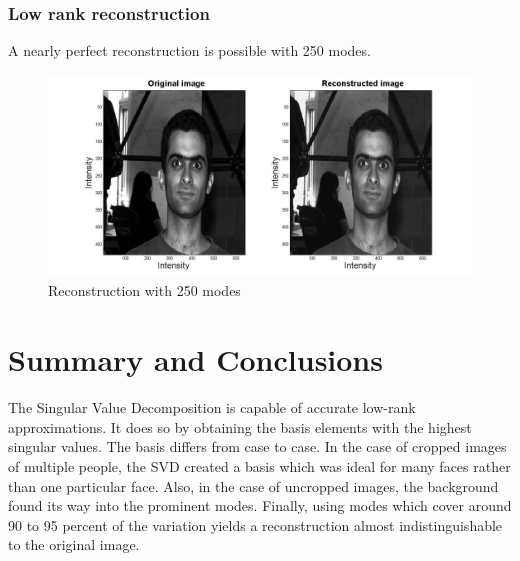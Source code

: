 \documentclass[a4paper]{article}
\begin{document}
\subsubsection{Low rank reconstruction}
A nearly perfect reconstruction is possible with 250 modes.	
\begin{figure}[h!] 
	
	\includegraphics[width=1.\textwidth]{reconun.jpg}
	
	\caption{Reconstruction with 250 modes}	
	

\end{figure}

\section{Summary and Conclusions}
The Singular Value Decomposition is capable of accurate low-rank approximations. It does so by obtaining the basis elements with the highest singular values. The basis differs from case to case. In the case of cropped images of multiple people, the SVD created a basis which was ideal for many faces rather than one particular face. Also, in the case of uncropped images, the background found its way into the prominent modes. Finally, using modes which cover around 90 to 95 percent of the variation yields a reconstruction almost indistinguishable to the original image.

\newpage

\appendix
\end{document}
